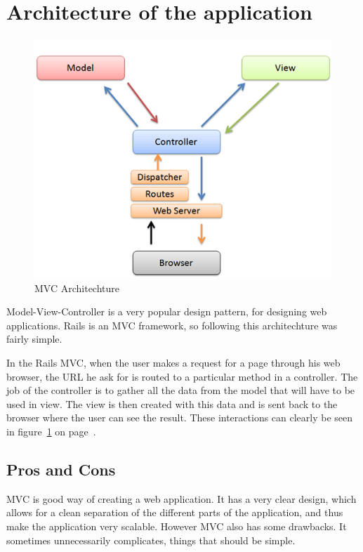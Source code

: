 \documentclass[12pt,a4paper]{article}
\begin{document}
\section{Architecture of the application}

\begin{figure}[h]
	\centering
	\includegraphics[scale=0.5]{src/mvc.png}
	\caption{\label{fig:mvc} MVC Architechture}
\end{figure}

Model-View-Controller is a very popular design pattern, for designing web
applications. Rails is an MVC framework, so following this architechture was
fairly simple.

In the Rails MVC, when the user makes a request for a page through his web
browser, the URL he ask for is routed to a particular method in a controller.
The job of the controller is to gather all the data from the model that
will have to be used in view. The view is then created with this data and is
sent back to the browser where the user can see the result. These interactions
can clearly be seen in figure~\ref{fig:mvc} on page~\pageref{fig:mvc}.


\subsection{Pros and Cons}

MVC is good way of creating a web application. It has a very clear design,
which allows for a clean separation of the different parts of the application,
and thus make the application very scalable. However MVC also has some
drawbacks. It sometimes unnecessarily complicates, things that should be simple.
\end{document}
